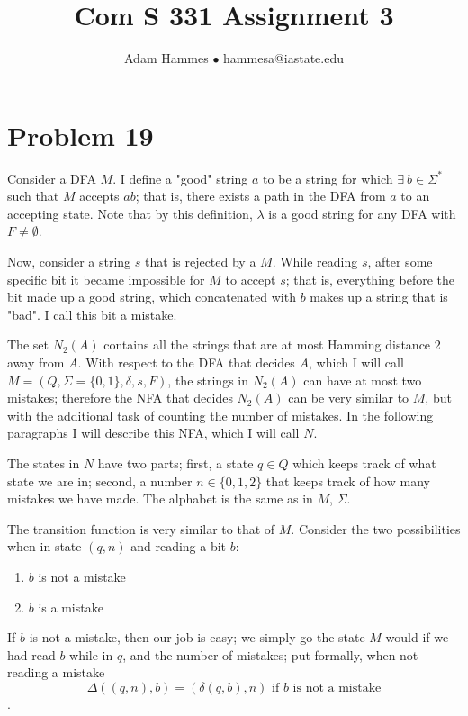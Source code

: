 \documentclass[11pt]{article}
\begin{document}
\title{Com S 331 Assignment 3}
\author{Adam Hammes $\bullet$ hammesa@iastate.edu }
\maketitle

\section*{Problem 19}
Consider a DFA $M$. I define a "good" string $a$ to be a string for which $ \exists\ b \in \Sigma^*$ such that $M$ accepts $ab$; that is, there exists a path in the DFA from $a$ to an accepting state. Note that by this definition, $\lambda$ is a good string for any DFA with $F \neq \emptyset$.

Now, consider a string $s$ that is rejected by a $M$. While reading $s$, after some specific bit it became impossible for $M$ to accept $s$; that is, everything before the bit made up a good string, which concatenated with $b$ makes up a string that is "bad". I call this bit a mistake.

The set $N_2(A)$ contains all the strings that are at most Hamming distance 2 away from $A$. With respect to the DFA that decides $A$, which I will call $M = (Q, \Sigma = \{0,1\}, \delta, s, F)$, the strings in $N_2(A)$ can have at most two mistakes; therefore the NFA that decides $N_2(A)$ can be very similar to $M$, but with the additional task of counting the number of mistakes. In the following paragraphs I will describe this NFA, which I will call $N$.  

The states in $N$ have two parts; first, a state $q \in Q$ which keeps track of what state we are in; second, a number $n \in \{0, 1, 2\}$ that keeps track of how many mistakes we have made. The alphabet is the same as in $M$, $\Sigma$.

The transition function is very similar to that of $M$. Consider the two possibilities when in state $(q, n)$ and reading a bit $b$:
\begin{enumerate}
	\item $b$ is not a mistake
	\item $b$ is a mistake
\end{enumerate}

If $b$ is not a mistake, then our job is easy; we simply go the state $M$ would if we had read $b$ while in $q$, and the number of mistakes; put formally, when not reading a mistake \[ \Delta( (q, n), b ) = (\delta( q, b), n) \text{ if $b$ is not a mistake} \].
\end{document}
